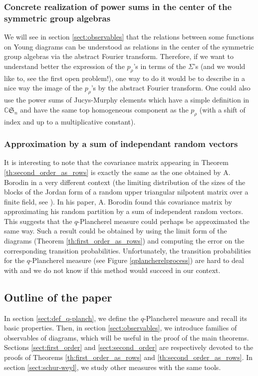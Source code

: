 \documentclass[10pt]{amsart}
\theoremstyle{remark}
\newcommand{\C}{\mathbb{C}}
\newcommand{\sym}{\mathfrak{S}}
\begin{document}
\subsubsection{Concrete realization of power sums in the center of the symmetric group algebras}
We will see in section \ref{sect:observables} that the relations between some functions on Young diagrams can be understood as relations in the center of the symmetric group algebras via the abstract Fourier transform. Therefore, if we want to understand better the expression of the $p_\rho$'s in terms of the $\varSigma$'s (and we would like to, see the first open problem!), one way to do it would be to describe in a nice way the image of the $p_\rho$'s by the abstract Fourier transform. One could also use the power sums of Jucys-Murphy elements which have a simple definition in $\C\sym_n$ and have the same top  homogeneous component as the $p_\rho$ (with a shift of index and up to a multiplicative constant).

\subsubsection{Approximation by a sum of independant random vectors}
It is interesting to note that the covariance matrix appearing in Theorem \ref{th:second_order_as_rows} is exactly the same as the one obtained by A. Borodin in a very different context (the limiting distribution of the sizes of the blocks of the Jordan form of a random upper triangular nilpotent matrix over a finite field, see \cite{Borodin:limitJordan}). In his paper, A. Borodin found this covariance matrix by approximating his random partition by a sum of independent random vectors. This suggests that the $q$-Plancherel measure could perhaps be approximated the same way. Such a result could be obtained by using the limit form of the diagrams (Theorem \ref{th:first_order_as_rows}) and computing the error on the corresponding transition probabilities. Unfortunately, the transition probabilities for the $q$-Plancherel measure (see Figure \ref{qplancherelprocess}) are hard to deal with and we do not know if this method would succeed in our context.
\bigskip

\subsection{Outline of the paper}
In section \ref{sect:def_q-planch}, we define the $q$-Plancherel measure and recall its basic pro\-perties. Then, in section \ref{sect:observables}, we introduce families of observables of diagrams, which will be useful in the proof of the main theorems. Sections \ref{sect:first_order} and \ref{sect:second_order} are respectively devoted to the proofs of Theorems \ref{th:first_order_as_rows} and \ref{th:second_order_as_rows}.
In section \ref{sect:schur-weyl}, we study other measures with the same tools.
\bigskip
\end{document}
